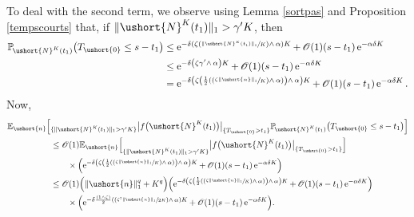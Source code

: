 \documentclass[11pt]{article}
\makeatletter
\newcommand{\Psfrac}[2]{(\sfrac{#1}{#2})}
\DeclareRobustCommand{\mathds}[1]{\csname jepbb@#1\endcsname}
\let\mathcal\mathscr
\numberwithin{equation}{section}
\theoremstyle{plain}
\theoremstyle{definition}
\newcommand{\proba}{{\mathbb{P}}}
\newcommand{\E}{{\mathbb{E}}}
\newcommand{\Oun}{\mathcal{O}(1)}
\newcommand{\un}{\mathds{1}}
\newcommand{\vecn}{\ushort{n}}
\newcommand{\veczer}{\ushort{0}}
\newcommand{\leproc}{\ushort{N}^{K}}
\newcommand{\sleproc}{\ushort{N}^{K}}
\newcommand{\e}{\operatorname{e}}
\newcommand{\norm}[1]{\|#1\|_{1}}\let\snorm\norm
\makeatother
\begin{document}
To deal with the second term, we observe using Lemma \ref{sortpas} and Proposition \ref{tempscourts} that,
if $\|\leproc(t_{1})\|_1> \gamma' K$, then
\begin{align*}
\proba_{\!\sleproc(t_{1})}\bigl(T_{\veczer}\le s-t_{1}\bigr)
& \le \e^{-\delta\left(\zeta\Psfrac{\|\sleproc(t_{1})\|_{1}}{K}\wedge\,\alpha\right)K}+\,\Oun (s-t_{1})\e^{-\alpha\delta K}\\
& \leq \e^{-\delta\left(\zeta\gamma'\wedge\,\alpha\right)K}+\,\Oun (s-t_{1})\e^{-\alpha\delta K}\\
& =\e^{-\delta\left(\zeta\left(\frac{1}{2} \left(\Psfrac{\zeta \|\vecn\|_{1}}{K} \wedge\, \alpha \right)\right)\wedge\,\alpha\right)K}+\,\Oun (s-t_{1})\e^{-\alpha\delta K}.
\end{align*}
Now,
\begin{align*}
\E_{\vecn}\Bigl[&\un_{\{\|\sleproc(t_{1})\|_1> \gamma' K\}}
\big|f\bigl(\leproc(t_{1})\bigr)\big|\un_{\{T_{\veczer}>t_{1}\}}
\proba_{\!\sleproc(t_{1})}\bigl(T_{\veczer}\le s-t_{1}\bigr)\Bigr]\\
& \leq \Oun \E_{\vecn}\Bigl[\un_{\{\|\sleproc(t_{1})\|_1> \gamma' K\}}
\big|f\bigl(\leproc(t_{1})\bigr)\big|\un_{\{T_{\veczer}>t_{1}\}}
\Bigr]\\
& \qquad\times \Bigl(\e^{-\delta\left(\zeta\left(\frac{1}{2} \left(\Psfrac{\zeta \|\vecn\|_{1}}{K} \wedge\, \alpha\right)\right)
\wedge\,\alpha\right)K}+\,\Oun (s-t_{1})\e^{-\alpha\delta K}\Bigr)\\
& \leq \Oun \Bigl(\norm{\vecn}^{q}+K^{q}\Bigr) \Bigl(\e^{-\delta\left(\zeta\left(\frac{1}{2} \left(\Psfrac{\zeta \|\vecn\|_{1}}{K}
\wedge\, \alpha\right)\right)\wedge\,\alpha\right)K}+\,\Oun (s-t_{1})\e^{-\alpha\delta K}\Bigr)\\
&
\qquad \times \Bigl(\e^{-\delta \frac{(1\wedge \zeta)}{2} \left(\Psfrac{\zeta^2 \|\vecn\|_{1}}{2K} \wedge\, \alpha\right)K}+\,
\Oun (s-t_{1})\e^{-\alpha\delta K}\Bigr).
\end{align*}
\end{document}
